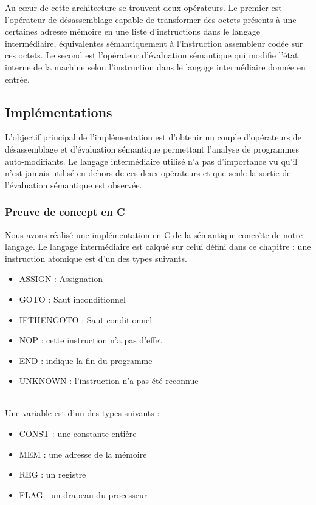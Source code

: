 Au c\oe ur de cette architecture se trouvent deux opérateurs. Le premier est l'opérateur de désassemblage capable de transformer des octets présents à une certaines adresse mémoire en une liste d'instructions dans le langage intermédiaire, équivalentes sémantiquement à l'instruction assembleur codée sur ces octets. 
Le second est l'opérateur d'évaluation sémantique qui modifie l'état interne de la machine selon l'instruction dans le langage intermédiaire donnée en entrée.

\subsection{Implémentations}
L'objectif principal de l'implémentation est d'obtenir un couple d'opérateurs de désassemblage et d'évaluation sémantique permettant l'analyse de programmes auto-modifiants.
Le langage intermédiaire utilisé n'a pas d'importance vu qu'il n'est jamais utilisé en dehors de ces deux opérateurs et que seule la sortie de l'évaluation sémantique est observée.

\subsubsection{Preuve de concept en C}
Nous avons réalisé une implémentation en C de la sémantique concrète de notre langage.
Le langage intermédiaire est calqué sur celui défini dans ce chapitre : une instruction atomique est d'un des types suivants.
\begin{itemize}
 \item ASSIGN : Assignation
 \item GOTO : Saut inconditionnel
 \item IFTHENGOTO : Saut conditionnel
 \item NOP : cette instruction n'a pas d'effet
 \item END : indique la fin du programme
 \item UNKNOWN : l'instruction n'a pas été reconnue
\end{itemize}
~\\
Une variable est d'un des types suivants :
\begin{itemize}
  \item CONST : une constante entière
  \item MEM : une adresse de la mémoire
  \item REG : un registre
  \item FLAG : un drapeau du processeur
\end{itemize}

